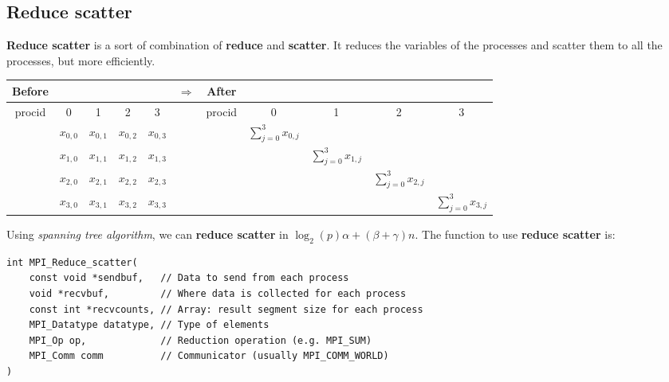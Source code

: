 \documentclass[12pt, openany]{report}
\theoremstyle{definition}
\begin{document}
\subsection{Reduce scatter}
\textbf{Reduce scatter} is a sort of combination of \textbf{reduce} and \textbf{scatter}. It reduces the variables of the processes and scatter them to all the processes, but more efficiently.\\
\begin{center}
	\begin{tabular}{ccccc|c|ccccc}
		Before &&&&& $\Longrightarrow$ &After&&&&\\
		\hline
		procid & 0 & 1 & 2 & 3 & & procid & 0 & 1 & 2 & 3\\
		\hline
		& $x_{0,0}$ & $x_{0,1}$ & $x_{0,2}$ & $x_{0,3}$ &&& $\displaystyle \sum_{j=0}^{3} x_{0,j}$ &&&\\
		& $x_{1,0}$ & $x_{1,1}$ & $x_{1,2}$ & $x_{1,3}$ &&&& $\displaystyle \sum_{j=0}^{3} x_{1,j}$ &&\\
		& $x_{2,0}$ & $x_{2,1}$ & $x_{2,2}$ & $x_{2,3}$ &&&&& $\displaystyle \sum_{j=0}^{3} x_{2,j}$ &\\
		& $x_{3,0}$ & $x_{3,1}$ & $x_{3,2}$ & $x_{3,3}$ &&&&&& $\displaystyle \sum_{j=0}^{3} x_{3,j}$ \\
		\hline
	\end{tabular}
\end{center}
Using \textit{spanning tree algorithm}, we can \textbf{reduce scatter} in $\log_2(p)\alpha + (\beta + \gamma) n$. The function to use \textbf{reduce scatter} is:
\begin{lstlisting}[style=CppStyle]
int MPI_Reduce_scatter(
    const void *sendbuf,   // Data to send from each process
    void *recvbuf,         // Where data is collected for each process 
    const int *recvcounts, // Array: result segment size for each process
    MPI_Datatype datatype, // Type of elements
    MPI_Op op,             // Reduction operation (e.g. MPI_SUM)
    MPI_Comm comm          // Communicator (usually MPI_COMM_WORLD)
)
\end{lstlisting}
\end{document}
